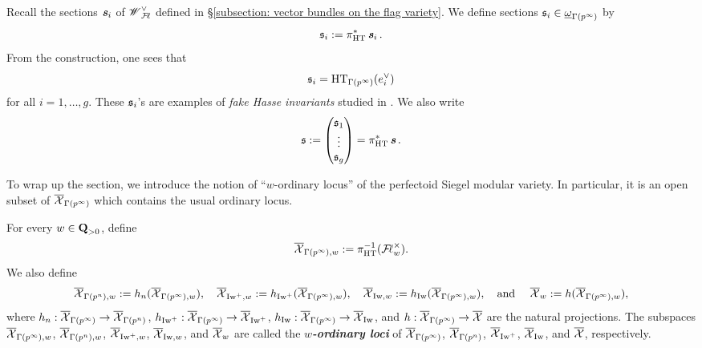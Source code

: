 Recall the sections $\bfits_i$ of $\scrW_{\adicFL}^{\vee}$ defined in \S \ref{subsection: vector bundles on the flag variety}. We define sections $\fraks_i\in \underline{\omega}_{\Gamma(p^{\infty})}$ by \begin{equation}\label{eq: fake Hasse invariants}
    \fraks_i:=\pi_{\HT}^*\bfits_i.
\end{equation} 
From the construction, one sees that
\begin{equation}\label{eq:fake Hasse invariants basis}
\fraks_i=\HT_{\Gamma(p^{\infty})}(e_i^{\vee})
\end{equation}
for all $i=1, \ldots, g$. These $\fraks_i$'s are examples of \textit{fake Hasse invariants} studied in \cite{Scholze-2015}. We also write $$\fraks:=\begin{pmatrix}\fraks_1\\ \vdots\\ \fraks_g\end{pmatrix}=\pi_{\HT}^*\bfits.$$ 

To wrap up the section, we introduce the notion of ``$w$-ordinary locus'' of the perfectoid Siegel modular variety. In particular, it is an open subset of $\overline{\calX}_{\Gamma(p^{\infty})}$ which contains the usual ordinary locus.

\begin{Definition}\label{Definition: w-ordinary}
For every $w\in \Q_{>0}$, define
\[\overline{\calX}_{\Gamma(p^{\infty}), w}:=\pi_{\HT}^{-1}(\adicFL_{w}^\times).\]
We also define
\[\overline{\calX}_{\Gamma(p^n), w}:=h_n(\overline{\calX}_{\Gamma(p^{\infty}), w}), \quad\overline{\calX}_{\Iw^+, w}:=h_{\Iw^+}(\overline{\calX}_{\Gamma(p^{\infty}), w}),\quad \overline{\calX}_{\Iw, w}:=h_{\Iw}(\overline{\calX}_{\Gamma(p^{\infty}), w}), \quad \text{and }\quad \overline{\calX}_w:=h(\overline{\calX}_{\Gamma(p^{\infty}), w}),\]
where $h_n: \overline{\calX}_{\Gamma(p^{\infty})} \rightarrow \overline{\calX}_{\Gamma(p^{n})}$, $h_{\Iw^+}: \overline{\calX}_{\Gamma(p^{\infty})}\rightarrow \overline{\calX}_{\Iw^+}$,  $h_{\Iw}: \overline{\calX}_{\Gamma(p^{\infty})}\rightarrow \overline{\calX}_{\Iw}$, and $h: \overline{\calX}_{\Gamma(p^{\infty})}\rightarrow \overline{\calX}$ are the natural projections. The subspaces $\overline{\calX}_{\Gamma(p^{\infty}), w}$, $\overline{\calX}_{\Gamma(p^n), w}$, $\overline{\calX}_{\Iw^+, w}$, $\overline{\calX}_{\Iw, w}$, and $\overline{\calX}_w$ are called the \textit{\textbf{$w$-ordinary loci}} of $\overline{\calX}_{\Gamma(p^{\infty})}$, $\overline{\calX}_{\Gamma(p^n)}$, $\overline{\calX}_{\Iw^+}$, $\overline{\calX}_{\Iw}$, and $\overline{\calX}$, respectively.
\end{Definition}

